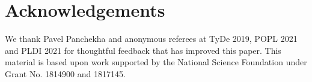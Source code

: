 
\section*{Acknowledgements}

We thank
Pavel Panchekha and  
 anonymous referees at TyDe 2019, POPL 2021 and PLDI 2021  
for thoughtful feedback that has improved this paper. 
This material is based upon work supported by the National Science Foundation 
under Grant No. 1814900 and 1817145. 